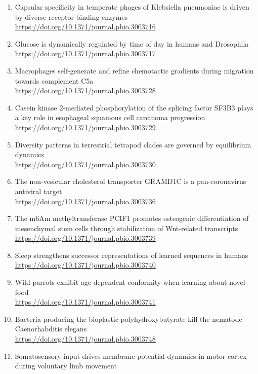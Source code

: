 \begin{enumerate}
        \url{https://doi.org/10.1371/journal.pbio.3003715}
  \item Capsular specificity in temperate phages of Klebsiella pneumoniae is driven by diverse receptor-binding enzymes\\
        \url{https://doi.org/10.1371/journal.pbio.3003716}
  \item Glucose is dynamically regulated by time of day in humans and Drosophila\\
        \url{https://doi.org/10.1371/journal.pbio.3003717}
  \item Macrophages self-generate and refine chemotactic gradients during migration towards complement C5a\\
        \url{https://doi.org/10.1371/journal.pbio.3003728}
  \item Casein kinase 2-mediated phosphorylation of the splicing factor SF3B3 plays a key role in esophageal squamous cell carcinoma progression\\
        \url{https://doi.org/10.1371/journal.pbio.3003729}
  \item Diversity patterns in terrestrial tetrapod clades are governed by equilibrium dynamics\\
        \url{https://doi.org/10.1371/journal.pbio.3003730}
  \item The non-vesicular cholesterol transporter GRAMD1C is a pan-coronavirus antiviral target\\
        \url{https://doi.org/10.1371/journal.pbio.3003736}
  \item The m6Am methyltransferase PCIF1 promotes osteogenic differentiation of mesenchymal stem cells through stabilization of Wnt-related transcripts\\
        \url{https://doi.org/10.1371/journal.pbio.3003739}
  \item Sleep strengthens successor representations of learned sequences in humans\\
        \url{https://doi.org/10.1371/journal.pbio.3003740}
  \item Wild parrots exhibit age-dependent conformity when learning about novel food\\
        \url{https://doi.org/10.1371/journal.pbio.3003741}
  \item Bacteria producing the bioplastic polyhydroxybutyrate kill the nematode Caenorhabditis elegans\\
        \url{https://doi.org/10.1371/journal.pbio.3003748}
  \item Somatosensory input drives membrane potential dynamics in motor cortex during voluntary limb movement\\

\end{enumerate}
